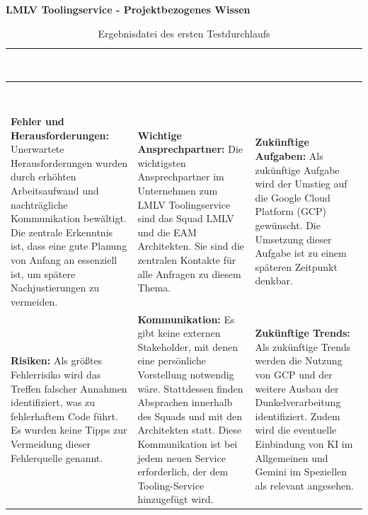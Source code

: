 \documentclass[
  10pt,
  ngerman,
  a4paper,
  toc=graduated,
  numbers=noenddot,
  headings=standardclasses,
  nonumberlist
]{scrartcl}
\renewcommand{\arraystretch}{1.0}
\begin{document}
\noindent\textbf{LMLV Toolingservice - Projektbezogenes Wissen}

\vspace{0.5cm}

{
\setlength{\tabcolsep}{4pt}
\renewcommand{\arraystretch}{1.15}

\begin{longtable}{|L{0.31\textwidth}|L{0.31\textwidth}|L{0.31\textwidth}|}
\caption{Ergebnisdatei des ersten Testdurchlaufs}
\label{tab:ergebnisdatei_durchlauf_1}\\
\hline
{}
\textcolor{white}{\textbf{Erfahrungen und Empfehlungen}} &
\textcolor{white}{\textbf{Prozesse und Arbeitsschritte}} &
\textcolor{white}{\textbf{Sonstiges}} \\
\hline
\endfirsthead

\hline
{}
\textcolor{white}{\textbf{Erfahrungen und Empfehlungen}} &
\textcolor{white}{\textbf{Prozesse und Arbeitsschritte}} &
\textcolor{white}{\textbf{Sonstiges}} \\
\hline
\endhead

\textbf{Fehler und Herausforderungen:}\newline
Unerwartete Herausforderungen wurden durch erhöhten Arbeitsaufwand und nachträgliche Kommunikation bewältigt. Die zentrale Erkenntnis ist, dass eine gute Planung von Anfang an essenziell ist, um spätere Nachjustierungen zu vermeiden.
&
\textbf{Wichtige Ansprechpartner:}\newline
Die wichtigsten Ansprechpartner im Unternehmen zum LMLV Toolingservice sind das Squad LMLV und die EAM Architekten. Sie sind die zentralen Kontakte für alle Anfragen zu diesem Thema.
&
\textbf{Zukünftige Aufgaben:}\newline
Als zukünftige Aufgabe wird der Umstieg auf die Google Cloud Platform (GCP) gewünscht. Die Umsetzung dieser Aufgabe ist zu einem späteren Zeitpunkt denkbar.
\\
\hline

\textbf{Risiken:}\newline
Als größtes Fehlerrisiko wird das Treffen falscher Annahmen identifiziert, was zu fehlerhaftem Code führt. Es wurden keine Tipps zur Vermeidung dieser Fehlerquelle genannt.
&
\textbf{Kommunikation:}\newline
Es gibt keine externen Stakeholder, mit denen eine persönliche Vorstellung notwendig wäre. Stattdessen finden Absprachen innerhalb des Squads und mit den Architekten statt. Diese Kommunikation ist bei jedem neuen Service erforderlich, der dem Tooling-Service hinzugefügt wird.
&
\textbf{Zukünftige Trends:}\newline
Als zukünftige Trends werden die Nutzung von GCP und der weitere Ausbau der Dunkelverarbeitung identifiziert. Zudem wird die eventuelle Einbindung von KI im Allgemeinen und Gemini im Speziellen als relevant angesehen.
\\
\hline


\end{longtable}}
\end{document}
